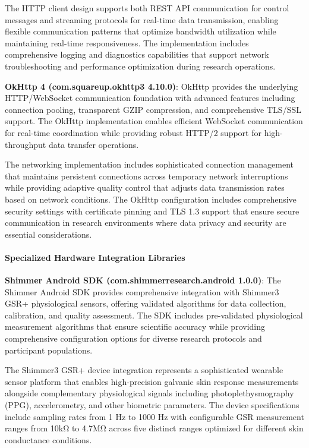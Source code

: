 \documentclass[12pt,a4paper]{report}
\begin{document}
The HTTP client design supports both REST API communication for control messages and streaming protocols for real-time
data transmission, enabling flexible communication patterns that optimize bandwidth utilization while maintaining
real-time responsiveness. The implementation includes comprehensive logging and diagnostics capabilities that support
network troubleshooting and performance optimization during research operations.

\textbf{OkHttp 4 (com.squareup.okhttp3 4.10.0)}: OkHttp provides the underlying HTTP/WebSocket communication foundation with
advanced features including connection pooling, transparent GZIP compression, and comprehensive TLS/SSL support. The
OkHttp implementation enables efficient WebSocket communication for real-time coordination while providing robust HTTP/2
support for high-throughput data transfer operations.

The networking implementation includes sophisticated connection management that maintains persistent connections across
temporary network interruptions while providing adaptive quality control that adjusts data transmission rates based on
network conditions. The OkHttp configuration includes comprehensive security settings with certificate pinning and TLS
1.3 support that ensure secure communication in research environments where data privacy and security are essential
considerations.

\paragraph{Specialized Hardware Integration Libraries}

\textbf{Shimmer Android SDK (com.shimmerresearch.android 1.0.0)}: The Shimmer Android SDK provides comprehensive integration
with Shimmer3 GSR+ physiological sensors, offering validated algorithms for data collection, calibration, and quality
assessment. The SDK includes pre-validated physiological measurement algorithms that ensure scientific accuracy while
providing comprehensive configuration options for diverse research protocols and participant populations.

The Shimmer3 GSR+ device integration represents a sophisticated wearable sensor platform that enables high-precision
galvanic skin response measurements alongside complementary physiological signals including photoplethysmography (PPG),
accelerometry, and other biometric parameters. The device specifications include sampling rates from 1 Hz to 1000 Hz
with configurable GSR measurement ranges from 10kΩ to 4.7MΩ across five distinct ranges optimized for different skin
conductance conditions.
\end{document}
